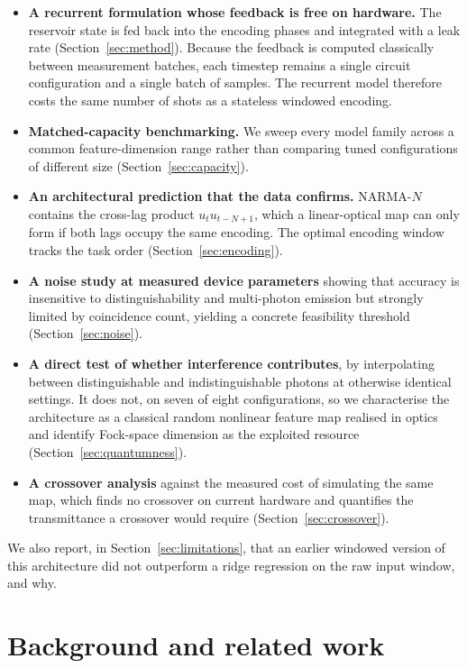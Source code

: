 \documentclass[11pt]{article}
\begin{document}
\begin{itemize}
  \item \textbf{A recurrent formulation whose feedback is free on hardware.} The reservoir
        state is fed back into the encoding phases and integrated with a leak rate
        (Section~\ref{sec:method}). Because the feedback is computed classically between
        measurement batches, each timestep remains a single circuit configuration and a
        single batch of samples. The recurrent model therefore costs the same number of shots
        as a stateless windowed encoding.
  \item \textbf{Matched-capacity benchmarking.} We sweep every model family across a common
        feature-dimension range rather than comparing tuned configurations of different size
        (Section~\ref{sec:capacity}).
  \item \textbf{An architectural prediction that the data confirms.} NARMA-$N$ contains the
        cross-lag product $u_t u_{t-N+1}$, which a linear-optical map can only form if both
        lags occupy the same encoding. The optimal encoding window tracks the task order
        (Section~\ref{sec:encoding}).
  \item \textbf{A noise study at measured device parameters} showing that accuracy is
        insensitive to distinguishability and multi-photon emission but strongly limited by
        coincidence count, yielding a concrete feasibility threshold
        (Section~\ref{sec:noise}).
  \item \textbf{A direct test of whether interference contributes}, by interpolating between
        distinguishable and indistinguishable photons at otherwise identical settings. It does
        not, on seven of eight configurations, so we characterise the architecture as a
        classical random nonlinear feature map realised in optics and identify Fock-space
        dimension as the exploited resource (Section~\ref{sec:quantumness}).
  \item \textbf{A crossover analysis} against the measured cost of simulating the same map,
        which finds no crossover on current hardware and quantifies the transmittance a
        crossover would require (Section~\ref{sec:crossover}).
\end{itemize}

We also report, in Section~\ref{sec:limitations}, that an earlier windowed version of this
architecture did not outperform a ridge regression on the raw input window, and why.

\section{Background and related work}\label{sec:background}
\end{document}
